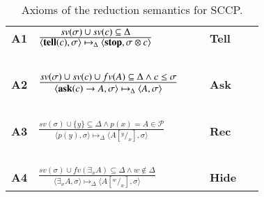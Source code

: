 \documentclass[main.tex]{subfiles}
\begin{document}
\begin{table}  %
   \begin{center}
   \begin{tabular}{llll} 
   \mbox{\bf A1}& $\frac{\displaystyle sv(\sigma) \cup sv(c) \subseteq \Delta } {\displaystyle \langle \hbox{{\bf tell}}(c), \sigma \rangle \mapsto_\Delta  \langle \hbox{{\bf stop}},
                                               \sigma \otimes c\rangle}$
   \ \ \ & \bf{Tell}&
  \\ 
  &\mbox{   }&\mbox{   } &\mbox{   }
  \\
  \mbox{\bf A2}& $\frac {\displaystyle sv(\sigma) \cup sv(c) \cup fv(A) \subseteq \Delta \wedge c \leq \sigma}{\displaystyle
  	\begin{array}{l} \langle \hbox{{\bf ask}}(c) \rightarrow A, \sigma \rangle \mapsto_\Delta \langle A, \sigma \rangle   	\end{array}}$
    \ \ \ & \bf{Ask}&
    \\
    &\mbox{   }&\mbox{   }&
    \\
  \mbox{\bf A3}& $\frac {\displaystyle sv(\sigma) \cup \{y\} \subseteq \Delta \wedge \displaystyle p(x) = A \in  \mathcal{P} }
  {\displaystyle\langle p(y),\sigma\rangle \mapsto_\Delta \langle  A[^y/_x], \sigma\rangle}$ 
  &\bf{Rec}&
    \\
   &\mbox{   }&\mbox{   }&
  \\
    \mbox{\bf A4}& $\frac {\displaystyle sv(\sigma) \cup fv(\exists_x A) \subseteq \Delta 
    \wedge w \not \in \Delta }
    {\displaystyle\langle \exists_x A,\sigma\rangle \mapsto_\Delta \langle A[^w/_x], \sigma\rangle}$
    &\bf{Hide}&
  \end{tabular}
  \end{center}
\caption{Axioms of the reduction semantics for SCCP.}
\label{fig:operational}
\end{table}
\end{document}
